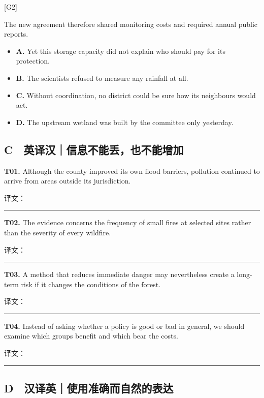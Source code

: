 \documentclass[
  11pt,
]{ctexart}
\begin{document}
{[}G2{]}

The new agreement therefore shared monitoring costs and required annual
public reports.

\begin{itemize}
\item
  \textbf{A.} Yet this storage capacity did not explain who should pay
  for its protection.
\item
  \textbf{B.} The scientists refused to measure any rainfall at all.
\item
  \textbf{C.} Without coordination, no district could be sure how its
  neighbours would act.
\item
  \textbf{D.} The upstream wetland was built by the committee only
  yesterday.
\end{itemize}

\subsection{C　英译汉｜信息不能丢，也不能增加}\label{c-ux82f1ux8bd1ux6c49ux4fe1ux606fux4e0dux80fdux4e22ux4e5fux4e0dux80fdux589eux52a0}

\textbf{T01.} Although the county improved its own flood barriers,
pollution continued to arrive from areas outside its jurisdiction.

译文：

\rule{0.8\linewidth}{0.35pt}

\textbf{T02.} The evidence concerns the frequency of small fires at
selected sites rather than the severity of every wildfire.

译文：

\rule{0.8\linewidth}{0.35pt}

\textbf{T03.} A method that reduces immediate danger may nevertheless
create a long-term risk if it changes the conditions of the forest.

译文：

\rule{0.8\linewidth}{0.35pt}

\textbf{T04.} Instead of asking whether a policy is good or bad in
general, we should examine which groups benefit and which bear the
costs.

译文：

\rule{0.8\linewidth}{0.35pt}

\subsection{D　汉译英｜使用准确而自然的表达}\label{d-ux6c49ux8bd1ux82f1ux4f7fux7528ux51c6ux786eux800cux81eaux7136ux7684ux8868ux8fbe}
\end{document}
